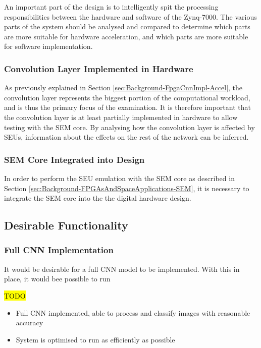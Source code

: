 \documentclass[12pt]{article}
\begin{document}
An important part of the design is to intelligently spit the processing responsibilities between the hardware and software of the Zynq-7000. The various parts of the system should be analysed and compared to determine which parts are more suitable for hardware acceleration, and which parts are more suitable for software implementation.

\subsubsection{Convolution Layer Implemented in Hardware}
\label{sec:ProjSpec-Necessary-Conv}

As previously explained in Section \ref{sec:Background-FpgaCnnImpl-Accel}, the convolution layer represents the biggest portion of the computational workload, and is thus the primary focus of the examination. It is therefore important that the convolution layer is at least partially implemented in hardware to allow testing with the SEM core. By analysing how the convolution layer is affected by SEUs, information about the effects on the rest of the network can be inferred.

\subsubsection{SEM Core Integrated into Design}
\label{sec:ProjSpec-Necessary-SEM}

In order to perform the SEU emulation with the SEM core as described in Section \ref{sec:Background-FPGAsAndSpaceApplications-SEM}, it is necessary to integrate the SEM core into the the digital hardware design. 

\subsection{Desirable Functionality}
\label{sec:ProjSpec-Desirable}

\subsubsection{Full CNN Implementation}
\label{sec:ProjSpec-Desirable-SEM}

It would be desirable for a full CNN model to be implemented. With this in place, it would bee possible to run 

\hl{TODO}

\begin{itemize}
\item Full CNN implemented, able to process and classify images with reasonable accuracy
\item System is optimised to run as efficiently as possible
\end{itemize}
\end{document}
